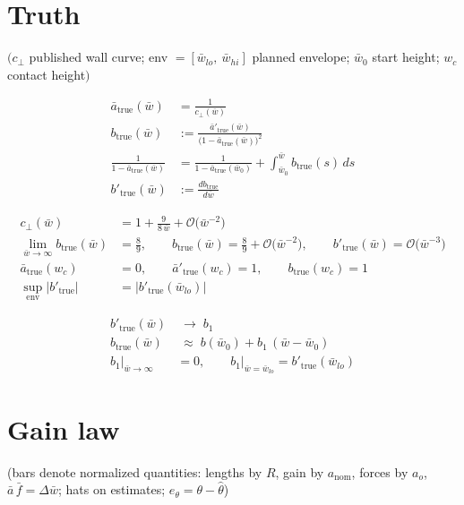 \documentclass[11pt,a4paper,fontset=none]{ctexart}
\newcommand{\ba}{\bar{a}}
\newcommand{\bw}{\bar{w}}
\newcommand{\dW}{\Delta\bw}
\begin{document}
\section{Truth}

$\bigl(c_\perp$ published wall curve; env $= [\bw_{lo},\ \bw_{hi}]$ planned envelope; $\bw_0$ start height; $w_c$ contact height$\bigr)$

\begin{align*}
\ba_{\mathrm{true}}(\bw) &= \frac{1}{c_\perp(\bw)} \\
b_{\mathrm{true}}(\bw)   &:= \frac{\ba'_{\mathrm{true}}(\bw)}{\bigl(1-\ba_{\mathrm{true}}(\bw)\bigr)^{2}} \\
\frac{1}{1-\ba_{\mathrm{true}}(\bw)} &= \frac{1}{1-\ba_{\mathrm{true}}(\bw_0)} + \int_{\bw_0}^{\bw} b_{\mathrm{true}}(s)\,ds \\
b'_{\mathrm{true}}(\bw)  &:= \frac{d b_{\mathrm{true}}}{d\bw}
\end{align*}

\begin{align*}
c_\perp(\bw) &= 1 + \frac{9}{8\,\bw} + \mathcal{O}\bigl(\bw^{-2}\bigr) \\
\lim_{\bw\to\infty} b_{\mathrm{true}}(\bw) &= \frac{8}{9}, \qquad
b_{\mathrm{true}}(\bw) = \frac{8}{9} + \mathcal{O}\bigl(\bw^{-2}\bigr), \qquad
b'_{\mathrm{true}}(\bw) = \mathcal{O}\bigl(\bw^{-3}\bigr) \\
\ba_{\mathrm{true}}(w_c) &= 0, \qquad \ba'_{\mathrm{true}}(w_c) = 1, \qquad b_{\mathrm{true}}(w_c) = 1 \\
\sup_{\text{env}}\bigl|b'_{\mathrm{true}}\bigr| &= \bigl|b'_{\mathrm{true}}(\bw_{lo})\bigr|
\end{align*}

\begin{align*}
b'_{\mathrm{true}}(\bw) &\;\to\; b_1 \\
b_{\mathrm{true}}(\bw)  &\;\approx\; b(\bw_0) + b_1\,(\bw - \bw_0) \\
b_1\big|_{\bw\to\infty} &= 0, \qquad b_1\big|_{\bw = \bw_{lo}} = b'_{\mathrm{true}}(\bw_{lo})
\end{align*}

\section{Gain law}

(bars denote normalized quantities: lengths by $R$, gain by $a_{\mathrm{nom}}$, forces by $a_o$, $\ba\,\bar f = \dW$;
hats on estimates; $e_\theta = \theta - \hat\theta$)
\end{document}
